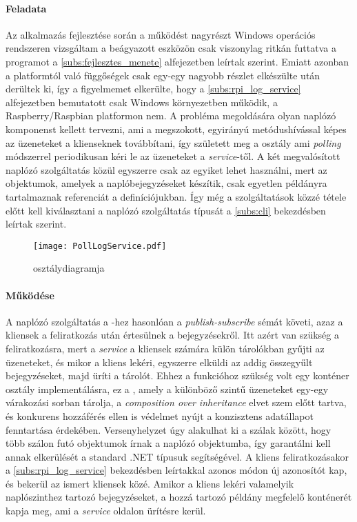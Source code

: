 \paragraph{Feladata} Az alkalmazás fejlesztése során a működést nagyrészt Windows operációs rendszeren vizsgáltam a beágyazott eszközön csak viszonylag ritkán futtatva a programot a \ref{subs:fejlesztes_menete} alfejezetben leírtak szerint. Emiatt azonban a platformtól való függőségek csak egy-egy nagyobb részlet elkészülte után derültek ki, így a figyelmemet elkerülte, hogy a \ref{subs:rpi_log_service} alfejezetben bemutatott  csak Windows környezetben működik, a Raspberry/Raspbian platformon nem. A probléma megoldására olyan naplózó komponenst kellett tervezni, ami a megszokott, egyirányú metódushívással képes az üzeneteket a klienseknek továbbítani, így született meg a  osztály ami \emph{polling} módszerrel periodikusan kéri le az üzeneteket a \emph{service}-től. A két megvalósított naplózó szolgáltatás közül egyszerre csak az egyiket lehet használni, mert az objektumok, amelyek a naplóbejegyzéseket készítik, csak egyetlen példányra tartalmaznak referenciát a definíciójukban. Így még a szolgáltatások közzé tétele előtt kell kiválasztani a naplózó szolgáltatás típusát a \ref{subs:cli} bekezdésben leírtak szerint.

\begin{figure}[h]
\vspace{.5cm}
\texttt{[image: PollLogService.pdf]}
\centering
\vspace{.2cm}
\caption{ osztálydiagramja}
\vspace{.5cm}
\label{fig:PollLogService_class}
\end{figure}

\paragraph{Működése} A naplózó szolgáltatás a -hez hasonlóan a \emph{publish-subscribe} sémát követi, azaz a kliensek a feliratkozás után értesülnek a bejegyzésekről. Itt azért van szükség a feliratkozásra, mert a \emph{service} a kliensek számára külön tárolókban gyűjti az üzeneteket, és mikor a kliens lekéri, egyszerre elküldi az addig összegyűlt bejegyzéseket, majd üríti a tárolót. Ehhez a funkcióhoz szükség volt egy konténer osztály implementálásra, ez a , amely a különböző szintű üzeneteket egy-egy várakozási sorban tárolja, a \emph{composition over inheritance} elvet szem előtt tartva, és konkurens hozzáférés ellen is védelmet nyújt a konzisztens adatállapot fenntartása érdekében. Versenyhelyzet úgy alakulhat ki a szálak között, hogy több szálon futó objektumok írnak a naplózó objektumba, így garantálni kell annak elkerülését a standard .NET típusuk segítségével. A kliens feliratkozásakor a \ref{subs:rpi_log_service} bekezdésben leírtakkal azonos módon új azonosítót kap, és bekerül az ismert kliensek közé. Amikor a kliens lekéri valamelyik naplószinthez tartozó bejegyzéseket, a hozzá tartozó  példány megfelelő konténerét kapja meg, ami a \emph{service} oldalon ürítésre kerül.

